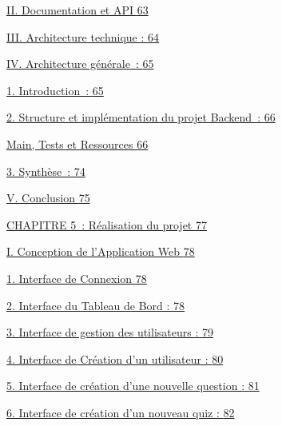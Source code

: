 \documentclass[12pt,a4paper,twoside]{report}
\begin{document}
\protect\hyperlink{documentation-et-api}{II. Documentation et API
\protect\hyperlink{documentation-et-api}{63}}

\protect\hyperlink{architecture-technique}{III. Architecture technique :
\protect\hyperlink{architecture-technique}{64}}

\protect\hyperlink{architecture-guxe9nuxe9rale}{IV. Architecture
générale~: \protect\hyperlink{architecture-guxe9nuxe9rale}{65}}

\protect\hyperlink{introduction}{1. Introduction~:
\protect\hyperlink{introduction}{65}}

\protect\hyperlink{structure-et-impluxe9mentation-du-projet-backend}{2.
Structure et implémentation du projet Backend~:
\protect\hyperlink{structure-et-impluxe9mentation-du-projet-backend}{66}}

\protect\hyperlink{main-tests-et-ressources}{Main, Tests et Ressources
\protect\hyperlink{main-tests-et-ressources}{66}}

\protect\hyperlink{_Toc204179733}{3. Synthèse~:
\protect\hyperlink{_Toc204179733}{74}}

\protect\hyperlink{conclusion-3}{V. Conclusion
\protect\hyperlink{conclusion-3}{75}}

\protect\hyperlink{section-7}{CHAPITRE 5~: Réalisation du projet
\protect\hyperlink{section-7}{77}}

\protect\hyperlink{conception-de-lapplication-web}{I. Conception de
l'Application Web
\protect\hyperlink{conception-de-lapplication-web}{78}}

\protect\hyperlink{interface-de-connexion}{1. Interface de Connexion
\protect\hyperlink{interface-de-connexion}{78}}

\protect\hyperlink{interface-du-tableau-de-bord}{2. Interface du Tableau
de Bord : \protect\hyperlink{interface-du-tableau-de-bord}{78}}

\protect\hyperlink{interface-de-gestion-des-utilisateurs}{3. Interface
de gestion des utilisateurs :
\protect\hyperlink{interface-de-gestion-des-utilisateurs}{79}}

\protect\hyperlink{interface-de-cruxe9ation-dun-utilisateur}{4.
Interface de Création d'un utilisateur :
\protect\hyperlink{interface-de-cruxe9ation-dun-utilisateur}{80}}

\protect\hyperlink{interface-de-cruxe9ation-dune-nouvelle-question}{5.
Interface de création d'une nouvelle question :
\protect\hyperlink{interface-de-cruxe9ation-dune-nouvelle-question}{81}}

\protect\hyperlink{interface-de-cruxe9ation-dun-nouveau-quiz}{6.
Interface de création d'un nouveau quiz :
\protect\hyperlink{interface-de-cruxe9ation-dun-nouveau-quiz}{82}}
\end{document}
